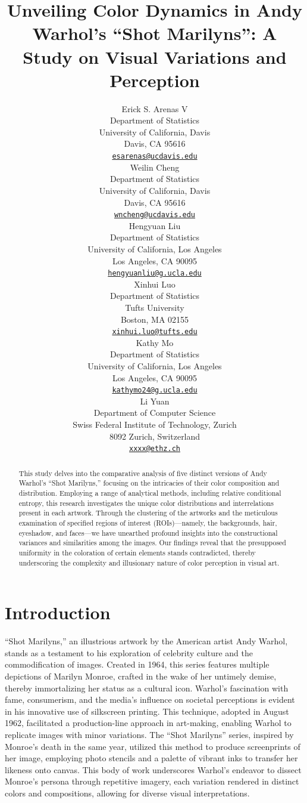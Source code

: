 \documentclass{article}
\title{Unveiling Color Dynamics in Andy Warhol's ``Shot Marilyns'': A
Study on Visual Variations and Perception}
\author{
    Erick S. Arenas V
   \\
    Department of Statistics \\
    University of California, Davis \\
  Davis, CA 95616 \\
  \texttt{\href{mailto:esarenas@ucdavis.edu}{\nolinkurl{esarenas@ucdavis.edu}}} \\
   \And
    Weilin Cheng
   \\
    Department of Statistics \\
    University of California, Davis \\
  Davis, CA 95616 \\
  \texttt{\href{mailto:wncheng@ucdavis.edu}{\nolinkurl{wncheng@ucdavis.edu}}} \\
   \And
    Hengyuan Liu
   \\
    Department of Statistics \\
    University of California, Los Angeles \\
  Los Angeles, CA 90095 \\
  \texttt{\href{mailto:hengyuanliu@g.ucla.edu}{\nolinkurl{hengyuanliu@g.ucla.edu}}} \\
   \And
    Xinhui Luo
   \\
    Department of Statistics \\
    Tufts University \\
  Boston, MA 02155 \\
  \texttt{\href{mailto:xinhui.luo@tufts.edu}{\nolinkurl{xinhui.luo@tufts.edu}}} \\
   \And
    Kathy Mo
   \\
    Department of Statistics \\
    University of California, Los Angeles \\
  Los Angeles, CA 90095 \\
  \texttt{\href{mailto:kathymo24@g.ucla.edu}{\nolinkurl{kathymo24@g.ucla.edu}}} \\
   \And
    Li Yuan
   \\
    Department of Computer Science \\
    Swiss Federal Institute of Technology, Zurich \\
  8092 Zurich, Switzerland \\
  \texttt{\href{mailto:xxxx@ethz.ch}{\nolinkurl{xxxx@ethz.ch}}} \\
  }
\begin{document}
\maketitle


\begin{abstract}
This study delves into the comparative analysis of five distinct
versions of Andy Warhol's ``Shot Marilyns,'' focusing on the intricacies
of their color composition and distribution. Employing a range of
analytical methods, including relative conditional entropy, this
research investigates the unique color distributions and interrelations
present in each artwork. Through the clustering of the artworks and the
meticulous examination of specified regions of interest (ROIs)---namely,
the backgrounds, hair, eyeshadow, and faces---we have unearthed profound
insights into the constructional variances and similarities among the
images. Our findings reveal that the presupposed uniformity in the
coloration of certain elements stands contradicted, thereby underscoring
the complexity and illusionary nature of color perception in visual art.
\end{abstract}


\hypertarget{introduction}{%
\section{Introduction}\label{introduction}}

``Shot Marilyns,'' an illustrious artwork by the American artist Andy
Warhol, stands as a testament to his exploration of celebrity culture
and the commodification of images. Created in 1964, this series features
multiple depictions of Marilyn Monroe, crafted in the wake of her
untimely demise, thereby immortalizing her status as a cultural icon.
Warhol's fascination with fame, consumerism, and the media's influence
on societal perceptions is evident in his innovative use of silkscreen
printing. This technique, adopted in August 1962, facilitated a
production-line approach in art-making, enabling Warhol to replicate
images with minor variations. The ``Shot Marilyns'' series, inspired by
Monroe's death in the same year, utilized this method to produce
screenprints of her image, employing photo stencils and a palette of
vibrant inks to transfer her likeness onto canvas. This body of work
underscores Warhol's endeavor to dissect Monroe's persona through
repetitive imagery, each variation rendered in distinct colors and
compositions, allowing for diverse visual interpretations.
\end{document}
